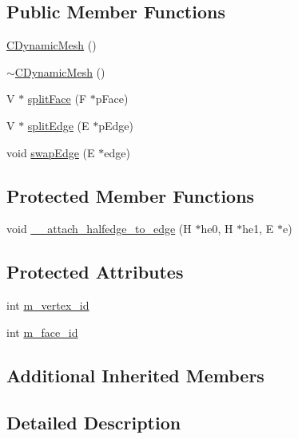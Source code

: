 \subsection*{Public Member Functions}
\begin{DoxyCompactItemize}
\item 
\hyperlink{class_mesh_lib_1_1_c_dynamic_mesh_a18dd6f395ba9e07c4d8372fd0a97e6ed}{C\+Dynamic\+Mesh} ()
\item 
\hyperlink{class_mesh_lib_1_1_c_dynamic_mesh_a69bc3754b47de04cbaf986b2544593a3}{$\sim$\+C\+Dynamic\+Mesh} ()
\item 
V $\ast$ \hyperlink{class_mesh_lib_1_1_c_dynamic_mesh_a9ddf90db68fb55fe7848e881b9ecef23}{split\+Face} (F $\ast$p\+Face)
\item 
V $\ast$ \hyperlink{class_mesh_lib_1_1_c_dynamic_mesh_aa793d46c1ee19c3e40fe5c4f9b31b2e8}{split\+Edge} (E $\ast$p\+Edge)
\item 
void \hyperlink{class_mesh_lib_1_1_c_dynamic_mesh_a6a24a61f7b4bb4a48427a4149a24d630}{swap\+Edge} (E $\ast$edge)
\end{DoxyCompactItemize}
\subsection*{Protected Member Functions}
\begin{DoxyCompactItemize}
\item 
void \hyperlink{class_mesh_lib_1_1_c_dynamic_mesh_ae069e367095757cc53bf9218aad6ef06}{\+\_\+\+\_\+attach\+\_\+halfedge\+\_\+to\+\_\+edge} (H $\ast$he0, H $\ast$he1, E $\ast$e)
\end{DoxyCompactItemize}
\subsection*{Protected Attributes}
\begin{DoxyCompactItemize}
\item 
int \hyperlink{class_mesh_lib_1_1_c_dynamic_mesh_aeb1cf2cd71ab4f8845c3d5204a0ca93d}{m\+\_\+vertex\+\_\+id}
\item 
int \hyperlink{class_mesh_lib_1_1_c_dynamic_mesh_af59ef3c93fa120fba2165f43f04c80ad}{m\+\_\+face\+\_\+id}
\end{DoxyCompactItemize}
\subsection*{Additional Inherited Members}


\subsection{Detailed Description}
